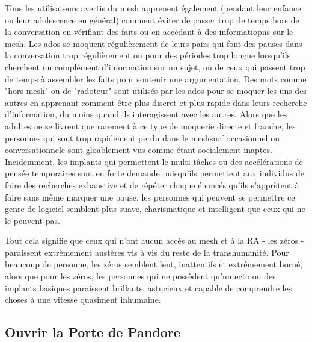       Tous les utilisateurs avertis du mesh apprenent également (pendant leur enfance ou leur adolescence en général) comment éviter de passer trop de temps hors de la conversation en vérifiant des faits ou en accédant à des informatiopns sur le mesh. Les ados se moquent régulièrement de leurs pairs qui font des pauses dans la conversation trop régulièrement ou pour des périodes trop longue lorsqu'ils cherchent un complément d'information sur un sujet, ou de ceux qui passent trop de temps à assembler les faits pour soutenir une argumentation. Des mots comme "hors mesh" ou de "radoteur" sont utilisés par les ados pour se moquer les uns des autres en apprenant comment être plus discret et plus rapide dans leurs recherche d'information, du moins quand ils interagissent avec les autres. Alors que les adultes ne se livrent que rarement à ce type de moquerie directe et franche, les personnes qui sont trop rapidement perdu dans le meshsurf occasionnel ou conversationnele sont gloablement vus comme étant socialement inaptes. Incidemment, les implants qui permettent le multi-tâches ou des accélérations de pensée temporaires sont en forte demande puisqu'ils permettent aux individus de faire des recherches exhaustive et de répéter chaque énoncés qu'ils s'apprètent à faire sans même marquer une pause. les personnes qui peuvent se permettre ce genre de logiciel semblent plus suave, charismatique et intelligent que ceux qui ne le peuvent pas. 

      Tout cela signifie que ceux qui n'ont aucun accès au mesh et à la RA - les zéros - paraissent extrèmement austères vis à vis du reste de la transhumanité. Pour beaucoup de personne, les zéros semblent lent, inattentifs et extrêmement borné, alors que pour les zéros, les personnes qui ne possèdent qu'un ecto ou des implants basiques paraissent brillants, astucieux et capable de comprendre les choses à une vitesse quasiment inhumaine. 

      \subsection{Ouvrir la Porte de Pandore} \label{sec:open-pand-gate} 

